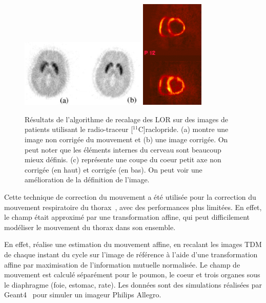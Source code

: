 \begin{figure}[h!]
	\begin{center}
		\includegraphics[width=6cm]{images/bloomfield2003design} \includegraphics[width=3cm]{images/livieratos2005rigid}
	\end{center}
	\caption{Résultats de l'algorithme de recalage des LOR sur des images de patients utilisant le radio-traceur [$^{11}$C]raclopride. (a) montre une image non corrigée du mouvement et (b) une image corrigée. On peut noter que les éléments internes du cerveau sont beaucoup mieux définis. (c) représente une coupe du coeur petit axe non corrigée (en haut) et corrigée (en bas). On peut voir une amélioration de la définition de l'image.} 
	\label{fig:ameliorationLOR}
\end{figure}
 
Cette technique de correction du mouvement a été utilisée pour la correction du mouvement respiratoire du thorax~\cite{lamare2007respiratory,lamare2007list}, avec des performances plus limitées. En effet, le champ était approximé par une transformation affine, qui peut difficilement modéliser le mouvement du thorax dans son ensemble.

En effet, \cite{lamare2007respiratory} réalise une estimation du mouvement affine, en recalant les images TDM de chaque instant du cycle sur l'image de référence à l'aide d'une transformation affine par maximisation de l'information mutuelle normalisée. Le champ de mouvement  est calculé séparément pour le poumon, le coeur et trois organes sous le diaphragme (foie, estomac, rate). Les données sont des simulations réalisées par Geant4~\cite{jan2004gate} pour simuler un imageur Philips Allegro.

